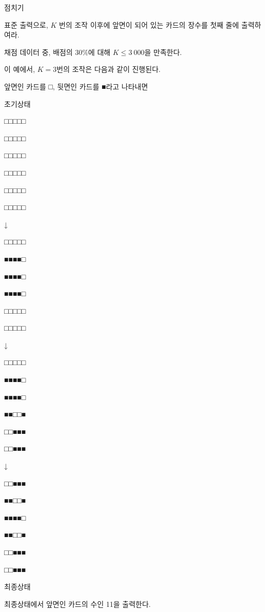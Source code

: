 \begin{problem}{점치기}
	
	\OutputFile
	
	표준 출력으로, $K$ 번의 조작 이후에 앞면이 되어 있는 카드의 장수를 첫째 줄에 출력하여라.
	
	\Scoring
	
	채점 데이터 중, 배점의 30\%에 대해 $K \le 3\ 000$을 만족한다.
	
	\Examples
		
	\begin{example}
	\end{example}
	 
	이 예에서, $K=3$번의 조작은 다음과 같이 진행된다.
	
	앞면인 카드를 □, 뒷면인 카드를 ■라고 나타내면
	
	\begin{center}
	초기상태
	
	□□□□□
	
	□□□□□
	
	□□□□□
	
	□□□□□
	
	□□□□□
	
	□□□□□
	
	↓
	
	□□□□□
	
	■■■■□
	
	■■■■□
	
	■■■■□
	
	□□□□□
	
	□□□□□
	
	↓
	
	□□□□□
	
	■■■■□
	
	■■■■□
	
	■■□□■
	
	□□■■■
	
	□□■■■
	
	↓
	
	□□■■■
	
	■■□□■
	
	■■■■□
	
	■■□□■
	
	□□■■■
	
	□□■■■
	
	최종상태

\end{center}

최종상태에서 앞면인 카드의 수인 11을 출력한다.
	
\end{problem}

